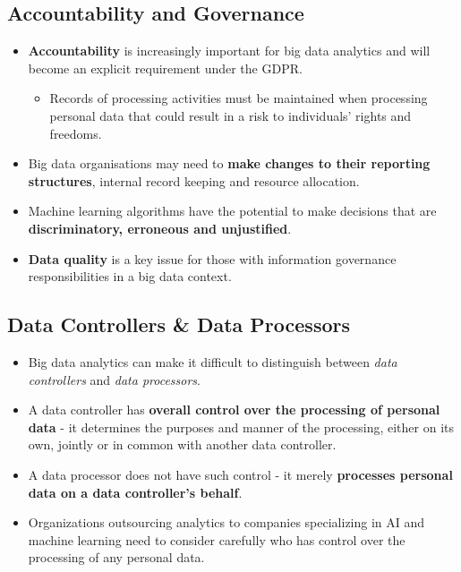 \documentclass[a4paper]{article}
\begin{document}
		\subsection{Accountability and Governance}
		
		\begin{itemize}
			\item \textbf{Accountability} is increasingly important for big data analytics and will become an explicit requirement under the GDPR.
				\begin{itemize}
					\item Records of processing activities must be maintained when processing personal data that could result in a risk to individuals' rights and freedoms.
				\end{itemize}
			\item Big data organisations may need to \textbf{make changes to their reporting structures}, internal record keeping and resource allocation.
			\item Machine learning algorithms have the potential to make decisions that are \textbf{discriminatory, erroneous and unjustified}.
			\item \textbf{Data quality} is a key issue for those with information governance responsibilities in a big data context.
		\end{itemize}
	
		\subsection{Data Controllers \& Data Processors}
		
		\begin{itemize}
			\item Big data analytics can make it difficult to distinguish between \textit{data controllers} and \textit{data processors}.
			\item A data controller has \textbf{overall control over the processing of personal data} - it determines the purposes and manner of the processing, either on its own, jointly or in common with another data controller.
			\item A data processor does not have such control - it merely \textbf{processes personal data on a data controller's behalf}.
			\item Organizations outsourcing analytics to companies specializing in AI and machine learning need to consider carefully who has control over the processing of any personal data.
		\end{itemize}
	
\end{document}
